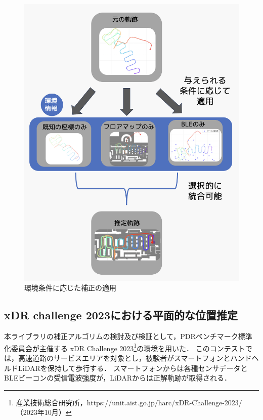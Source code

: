\documentclass[a4paper, 10pt, twocolumn]{jarticle}
\begin{document}
\begin{figure}[h]
    \centering
    \includegraphics[width=\linewidth]{image/integrate4.jpg}
    \caption{環境条件に応じた補正の適用}
    \label{fig:corrector-class}
\end{figure}



\subsection{xDR challenge 2023における平面的な位置推定}
本ライブラリの補正アルゴリムの検討及び検証として，PDRベンチマーク標準化委員会が主催する
xDR Challenge 2023\footnote{産業技術総合研究所，https://unit.aist.go.jp/harc/xDR-Challenge-2023/（2023年10月）}の環境を用いた．
このコンテストでは，高速道路のサービスエリアを対象とし，被験者がスマートフォンとハンドヘルドLiDARを保持して歩行する．
スマートフォンからは各種センサデータとBLEビーコンの受信電波強度が，LiDARからは正解軌跡が取得される．
\end{document}
